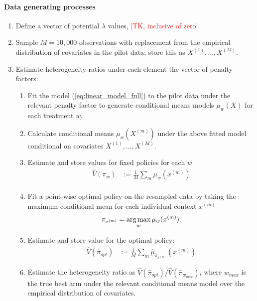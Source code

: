 \documentclass[letterpaper, 12pt, parskip=full,]{scrartcl}
\begin{document}
\paragraph{Data generating processes}
\begin{enumerate}
\item Define a vector of potential $\lambda$ values, \textcolor{red}{[TK, inclusive of zero]}. 
\item  Sample $M=10,000$ observations with replacement from the empirical distribution of covariates in the pilot data; store this as $X^{(1)}, \dots,X^{(M)}$. 
\item Estimate heterogeneity ratios under each element the vector of penalty factors:
\begin{enumerate}
\item Fit the model (\ref{eq:linear_model_full}) to the pilot data under the relevant penalty factor to generate conditional means models $\mu_{w}(X)$ for each treatment $w$.
  \item Calculate conditional means $\mu_{w}(X^{(m)})$ under the above fitted model conditional on covariates $X^{(1)}, \dots,X^{(M)}$. 
  \item Estimate and store values for fixed policies for each $w$
      \begin{align*}
          \hat{V}({\pi}_{w})  &:= \frac{1}{M} \sum_{m} \mu_{w}(x^{(m)}) \\
          \end{align*}
  \item Fit a point-wise optimal policy on the resampled data by taking the maximum conditional mean for each individual context $x^{(m)}$ 
    \begin{equation}
     \pi_{x^{(m)}} = \operatorname*{arg\,max}_{ w } \mu_{w}(x^{(m)}) . 
    \end{equation} 
    \item Estimate and store value for the optimal policy:
    \begin{align*}
      \hat{V}(\hat{\pi}_{opt})  &:= \frac{1}{M} \sum_m \hat{\mu}_{\hat{\pi}_{x^{(m)}}}(x^{(m)}) 
          \end{align*}
  \item Estimate the heterogeneity ratio as $\hat{V}(\hat{\pi}_{opt})/\hat{V}(\hat{\pi}_{w_{max}})$, where $w_{max}$ is the true best arm under the relevant conditional means model over the empirical distribution of covariates. 
\end{enumerate}

\end{enumerate}
\end{document}
